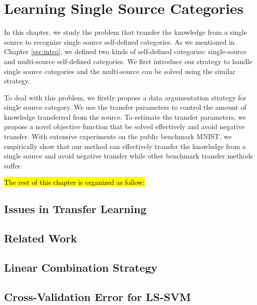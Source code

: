\chapter{Learning Single Source Categories}
In this chapter, we study the problem that transfer the knowledge from a single source to recognize single source self-defined categories. As we mentioned in Chapter \ref{sec:intro}, we defined two kinds of self-defined categories: single-source and multi-source self-defined categories. We first introduce our strategy to handle single source categories and the multi-source can be solved using the similar strategy.

To deal with this problem, we firstly propose a data argumentation strategy for single source category. We use the transfer parameters to control the amount of knowledge transferred from the source. To estimate the transfer parameters, we propose a novel objective function that be solved effectively and avoid negative transfer. With extensive experiments on the public benchmark MNIST, we empirically show that our method can effectively transfer the knowledge from a single source and avoid negative transfer while other benchmark transfer methods suffer.

\hl{The rest of this chapter is organized as follow:}
\section{Issues in Transfer Learning}

\section{Related Work}\label{sec:single:rl}

\section{Linear Combination Strategy}\label{sec:single:comb}

\section{Cross-Validation Error for LS-SVM}

